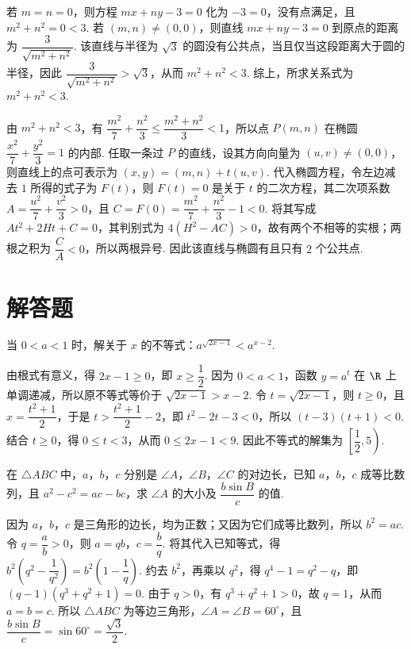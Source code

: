 \begin{solution}
若 \(m=n=0\)，则方程 \(mx+ny-3=0\) 化为 \(-3=0\)，没有点满足，且 \(m^2+n^2=0<3\). 若 \((m,n)\ne(0,0)\)，则直线 \(mx+ny-3=0\) 到原点的距离为 \(\dfrac{3}{\sqrt{m^2+n^2}}\). 该直线与半径为 \(\sqrt{3}\) 的圆没有公共点，当且仅当这段距离大于圆的半径，因此 \(\dfrac{3}{\sqrt{m^2+n^2}}>\sqrt{3}\)，从而 \(m^2+n^2<3\). 综上，所求关系式为 \(m^2+n^2<3\).

由 \(m^2+n^2<3\)，有 \(\dfrac{m^2}{7}+\dfrac{n^2}{3}\le\dfrac{m^2+n^2}{3}<1\)，所以点 \(P(m,n)\) 在椭圆 \(\dfrac{x^2}{7}+\dfrac{y^2}{3}=1\) 的内部. 任取一条过 \(P\) 的直线，设其方向向量为 \((u,v)\ne(0,0)\)，则直线上的点可表示为 \((x,y)=(m,n)+t(u,v)\). 代入椭圆方程，令左边减去 \(1\) 所得的式子为 \(F(t)\)，则 \(F(t)=0\) 是关于 \(t\) 的二次方程，其二次项系数 \(A=\dfrac{u^2}{7}+\dfrac{v^2}{3}>0\)，且 \(C=F(0)=\dfrac{m^2}{7}+\dfrac{n^2}{3}-1<0\). 将其写成 \(At^2+2Ht+C=0\)，其判别式为 \(4(H^2-AC)>0\)，故有两个不相等的实根；两根之积为 \(\dfrac{C}{A}<0\)，所以两根异号. 因此该直线与椭圆有且只有 \(2\) 个公共点.
\end{solution}

\section{解答题}
\begin{problem}
当 \(0<a<1\) 时，解关于 \(x\) 的不等式：\(a^{\sqrt{2x-1}}<a^{x-2}\).
\end{problem}

\begin{solution}
由根式有意义，得 \(2x-1\ge0\)，即 \(x\ge\dfrac12\). 因为 \(0<a<1\)，函数 \(y=a^t\) 在 \(\R\) 上单调递减，所以原不等式等价于 \(\sqrt{2x-1}>x-2\). 令 \(t=\sqrt{2x-1}\)，则 \(t\ge0\)，且 \(x=\dfrac{t^2+1}{2}\)，于是 \(t>\dfrac{t^2+1}{2}-2\)，即 \(t^2-2t-3<0\)，所以 \(\left(t-3\right)\left(t+1\right)<0\). 结合 \(t\ge0\)，得 \(0\le t<3\)，从而 \(0\le2x-1<9\). 因此不等式的解集为 \(\left[\dfrac12,5\right)\).
\end{solution}

\begin{problem}
在 \(\triangle ABC\) 中，\(a\)，\(b\)，\(c\) 分别是 \(\angle A\)，\(\angle B\)，\(\angle C\) 的对边长，已知 \(a\)，\(b\)，\(c\) 成等比数列，且 \(a^2-c^2=ac-bc\)，求 \(\angle A\) 的大小及 \(\dfrac{b\sin B}{c}\) 的值.
\end{problem}

\begin{solution}
因为 \(a\)，\(b\)，\(c\) 是三角形的边长，均为正数；又因为它们成等比数列，所以 \(b^2=ac\). 令 \(q=\dfrac{a}{b}>0\)，则 \(a=qb\)，\(c=\dfrac{b}{q}\). 将其代入已知等式，得 \(b^2\left(q^2-\dfrac1{q^2}\right)=b^2\left(1-\dfrac1q\right)\). 约去 \(b^2\)，再乘以 \(q^2\)，得 \(q^4-1=q^2-q\)，即 \(\left(q-1\right)\left(q^3+q^2+1\right)=0\). 由于 \(q>0\)，有 \(q^3+q^2+1>0\)，故 \(q=1\)，从而 \(a=b=c\). 所以 \(\triangle ABC\) 为等边三角形，\(\angle A=\angle B=60^{\circ}\)，且 \(\dfrac{b\sin B}{c}=\sin60^{\circ}=\dfrac{\sqrt{3}}2\).
\end{solution}

